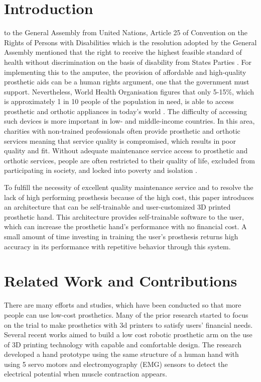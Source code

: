 \documentclass[conference]{IEEEtran}
\begin{document}
\section{Introduction}
 to the General Assembly from United Nations, Article 25 of Convention on the Rights of Persons with Disabilities which is the resolution adopted by the General Assembly mentioned that the right to receive the highest feasible standard of health without discrimination on the basis of disability from States Parties \cite{UN}. For implementing this to the amputee, the provision of affordable and high-quality prosthetic aids can be a human rights argument, one that the government must support. Nevertheless, World Health Organisation figures that only 5-15\%, which is approximately 1 in 10 people of the population in need, is able to access prosthetic and orthotic appliances in today's world \cite{WHO}. The difficulty of accessing such devices is more important in low- and middle-income countries. In this area, charities with non-trained professionals often provide prosthetic and orthotic services meaning that service quality is compromised, which results in poor quality and fit. Without adequate maintenance service access to prosthetic and orthotic services, people are often restricted to their quality of life, excluded from participating in society, and locked into poverty and isolation \cite{WHO}.

To fulfill the necessity of excellent quality maintenance service and to resolve the lack of high performing prosthesis because of the high cost, this paper introduces an architecture that can be self-trainable and user-customized 3D printed prosthetic hand. This architecture provides self-trainable software to the user, which can increase the prosthetic hand's performance with no financial cost. A small amount of time investing in training the user's prosthesis returns high accuracy in its performance with repetitive behavior through this system.




\section{Related Work and Contributions}
There are many efforts and studies, which have been conducted so that more people can use low-cost prosthetics. Many of the prior research started to focus on the trial to make prosthetics with 3d printers to satisfy users' financial needs. Several
recent works \cite{3D2}\cite{3D3}\cite{3D4} aimed to build a low cost robotic prosthetic arm on the use of 3D printing technology with capable and comfortable design. The research \cite{3D1} developed a hand prototype using the same structure of a human hand with using 5 servo motors and electromyography (EMG) sensors to detect the electrical potential when muscle contraction appears. 
\end{document}
